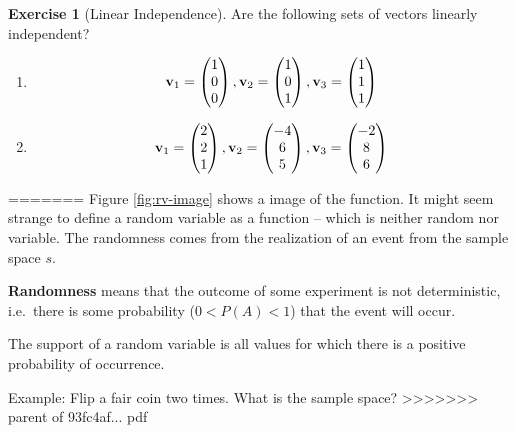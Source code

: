 \documentclass[]{book}
\theoremstyle{definition}
\theoremstyle{definition}
\theoremstyle{definition}
\newtheorem{exercise}{Exercise}[chapter]
\theoremstyle{remark}
\begin{document}
\begin{exercise}[Linear Independence]
\protect\hypertarget{exr:linearindep1}{}{\label{exr:linearindep1} {} }
Are the following sets of vectors linearly independent?

\begin{enumerate}
\def\labelenumi{\arabic{enumi}.}
\item
  \[{\bf v}_1 = \begin{pmatrix} 1 \\ 0 \\ 0 \end{pmatrix} , {\bf v}_2 = \begin{pmatrix} 1 \\ 0 \\ 1 \end{pmatrix} , {\bf v}_3 = \begin{pmatrix} 1 \\ 1 \\ 1 \end{pmatrix} \]
\item
  \[{\bf v}_1 = \begin{pmatrix} 2 \\ 2 \\ 1 \end{pmatrix} , {\bf v}_2 = \begin{pmatrix} -4 \\ 6 \\ 5 \end{pmatrix} , {\bf v}_3 = \begin{pmatrix} -2 \\ 8 \\ 6 \end{pmatrix} \]
\end{enumerate}
\end{exercise}
=======
Figure \ref{fig:rv-image} shows a image of the function. It might seem strange to define a random variable as a function -- which is neither random nor variable. The randomness comes from the realization of an event from the sample space \(s\).

\textbf{Randomness} means that the outcome of some experiment is not deterministic, i.e.~there is some probability (\(0 < P(A) < 1\)) that the event will occur.

The support of a random variable is all values for which there is a positive probability of occurrence.

Example: Flip a fair coin two times. What is the sample space?
>>>>>>> parent of 93fc4af... pdf
\end{document}
